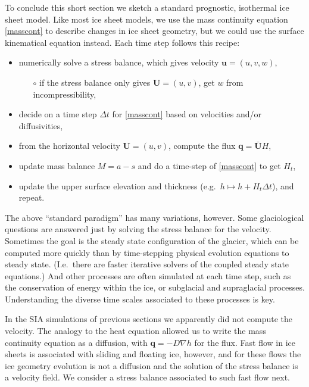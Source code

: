 \documentclass[titlepage,a4paper,final,12pt]{scrartcl}
\newcommand{\bq}{\mathbf{q}}
\newcommand{\bU}{\mathbf{U}}
\begin{document}
To conclude this short section we sketch a standard prognostic, isothermal ice sheet model.  Like most ice sheet models, we use the mass continuity equation \eqref{masscont} to describe changes in ice sheet geometry, but we could use the surface kinematical equation instead.  Each time step follows this recipe:
  \begin{itemize}
  \item numerically solve a stress balance, which gives velocity $\mathbf{u}=(u,v,w)$,
    \begin{itemize}
    \item[$\circ$] if the stress balance only gives $\mathbf{U}=(u,v)$, get $w$ from incompressibility,
    \end{itemize}
  \item decide on a time step $\Delta t$ for \eqref{masscont} based on velocities and/or diffusivities,
  \item from the horizontal velocity $\mathbf{U}=(u,v)$, compute the flux $\bq = \bar{\bU} H$,
  \item update mass balance $M=a-s$ and do a time-step of \eqref{masscont} to get $H_t$,
  \item update the upper surface elevation and thickness (e.g.~$h \mapsto h + H_t \Delta t$), and repeat.
  \end{itemize}

The above ``standard paradigm'' has many variations, however.  Some glaciological questions are answered just by solving the stress balance for the velocity.  Sometimes the goal is the steady state configuration of the glacier, which can be computed more quickly than by time-stepping physical evolution equations to steady state.  (I.e.~there are faster iterative solvers of the coupled steady state equations.)  And other processes are often simulated at each time step, such as the conservation of energy within the ice, or subglacial and supraglacial processes.  Understanding the diverse time scales associated to these processes is key.

In the SIA simulations of previous sections we apparently did not compute the velocity.  The analogy to the heat equation allowed us to write the mass continuity equation as a diffusion, with $\bq=-D\nabla h$ for the flux.  Fast flow in ice sheets is associated with sliding and floating ice, however, and for these flows the ice geometry evolution is not a diffusion and the solution of the stress balance is a velocity field.  We consider a stress balance associated to such fast flow next.
\end{document}
